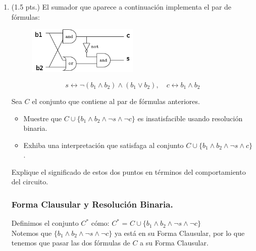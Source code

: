 \documentclass[12pt,letterpaper]{article}
\begin{document}
\begin{enumerate}
  
  \item (1.5 pts.) El sumador que aparece a continuación implementa el par de fórmulas:
    \begin{figure}[H]
      \centering
      \includegraphics[width=0.5\textwidth]{circuit.png}
    \end{figure}

    \[
    s \leftrightarrow \neg (b_1 \land b_2) \land (b_1 \lor b_2), \quad c \leftrightarrow b_1 \land b_2
    \]
  
    Sea $C$ el conjunto que contiene al par de fórmulas anteriores.
    
    \begin{itemize}[label=]
    \item Muestre que $C \cup \{b_1 \land b_2 \land \neg s \land \neg c\}$ es insatisfacible usando resolución binaria.
    \item Exhiba una interpretación que satisfaga al conjunto $C \cup \{b_1 \land b_2 \land \neg s \land c\}$.
  \end{itemize}
    
  Explique el significado de estos dos puntos en términos del comportamiento del circuito.
  
  \bigskip
  \subsubsection*{Forma Clausular y Resoluci\'{o}n Binaria.}
  Definimos el conjunto $C^*$ c\'{o}mo: $C^*$ = $C \cup \{b_1 \land b_2 \land \neg s \land \neg c\}$ \\
  Notemos que $\{b_1 \land b_2 \land \neg s \land \neg c\}$ ya est\'{a} en su Forma Clausular, por lo que tenemos que pasar las dos f\'{o}rmulas de $C$ a su Forma Clausular.
  

\end{enumerate}
\end{document}
